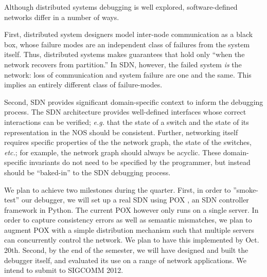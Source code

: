 \documentclass{sig-alternate-10pt}
\newcommand{\eg}{{\it e.g.}}
\newcommand{\etc}{{\it etc.}}
\begin{document}
Although distributed systems debugging is well explored,
 software-defined networks differ in a number of ways.

	First, distributed system designers model inter-node communication as a black box, whose failure modes are an independent class of failures from the system itself.
	Thus, distributed systems makes guarantees that hold only ``when the network recovers from partition.''
	In SDN, however, the failed system {\it is} the network: loss of
    communication and system failure are one and the same. This implies an
    entirely different class of failure-modes.

	Second, SDN provides significant domain-specific context to inform the debugging process.
	The  SDN architecture provides well-defined interfaces whose correct interactions can be verified; \eg{} that the state of a switch and the state of its representation in the NOS should be consistent.
	Further, networking itself requires specific properties of the the network graph, the state of the switches, \etc{}; for example, the network graph should always be acyclic.
	These domain-specific invariants do not need to be specified by the programmer, but instead should be ``baked-in'' to the SDN debugging process.


We plan to achieve two milestones during the quarter. First, in order to
''smoke-test'' our debugger, we will set up a real SDN using POX \cite{POX}, an SDN controller framework in Python.
The current POX however only runs on a single server.
In order to capture consistency errors as well as semantic mismatches, we plan to augment POX
with a simple distribution mechanism such that multiple servers can concurrently control the
network. We plan to have this implemented by Oct. 20th. Second, 
by the end of the semester, we will have designed and built the
debugger itself, and evaluated its use on a range of network applications. We intend to submit to SIGCOMM 2012.
\end{document}
